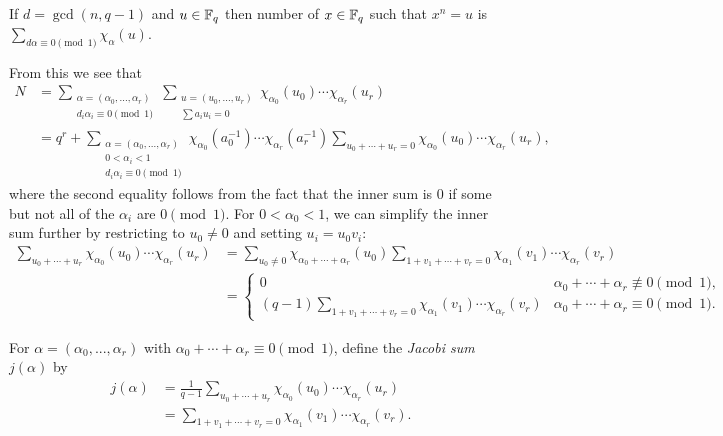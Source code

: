 \begin{prop} If $d = \gcd(n,q-1)$ and $u\in \mathbb{F}_q$ then number of $x\in \mathbb{F}_q$ such that $x^n = u$ is $\sum_{d\alpha \equiv 0\pmod{1}} \chi_\alpha(u)$.
\end{prop}

From this we see that
\begin{align*}
N &= \sum_{\substack{\alpha=(\alpha_0,...,\alpha_r)\\ d_i\alpha_i \equiv 0\pmod{1}}} \sum_{\substack{u=(u_0,...,u_r)\\ \sum a_iu_i = 0}} \chi_{\alpha_0}(u_0)\cdots\chi_{\alpha_r}(u_r)\\
&= q^r + \sum_{\substack{\alpha=(\alpha_0,...,\alpha_r)\\ 0 < \alpha_i < 1\\ d_i\alpha_i \equiv 0\pmod{1}}} \chi_{\alpha_0}(a_0^{-1})\cdots\chi_{\alpha_r}(a_r^{-1}) \sum_{u_0 + \cdots + u_r = 0} \chi_{\alpha_0}(u_0)\cdots\chi_{\alpha_r}(u_r),
\end{align*}
where the second equality follows from the fact that the inner sum is $0$ if some but not all of the $\alpha_i$ are $0\pmod{1}$. For $0 < \alpha_0 < 1$, we can simplify the inner sum further by restricting to $u_0 \ne 0$ and setting $u_i = u_0v_i$:
\begin{align*}
\sum_{u_0+\cdots+u_r} \chi_{\alpha_0}(u_0)\cdots\chi_{\alpha_r}(u_r) &= \sum_{u_0 \ne 0} \chi_{\alpha_0+\cdots+\alpha_r}(u_0) \sum_{1+v_1+\cdots+v_r = 0} \chi_{\alpha_1}(v_1)\cdots\chi_{\alpha_r}(v_r)\\
&= \begin{cases} 0 & \alpha_0 + \cdots + \alpha_r \not\equiv 0\pmod{1},\\ (q-1)\sum_{1+v_1+\cdots+v_r = 0} \chi_{\alpha_1}(v_1)\cdots\chi_{\alpha_r}(v_r) & \alpha_0+\cdots+\alpha_r \equiv 0 \pmod{1}.\end{cases}
\end{align*}

\begin{defn} For $\alpha = (\alpha_0, ..., \alpha_r)$ with $\alpha_0 + \cdots + \alpha_r \equiv 0 \pmod{1}$, define the \emph{Jacobi sum} $j(\alpha)$ by
\begin{align*}
j(\alpha) &= \frac{1}{q-1}\sum_{u_0+\cdots+u_r} \chi_{\alpha_0}(u_0)\cdots\chi_{\alpha_r}(u_r)\\
&= \sum_{1+v_1+\cdots+v_r = 0} \chi_{\alpha_1}(v_1)\cdots\chi_{\alpha_r}(v_r).
\end{align*}
\end{defn}

